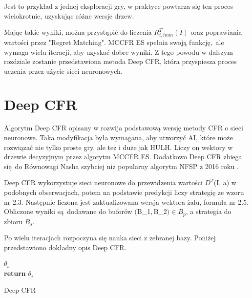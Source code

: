\documentclass[12pt,oneside,a4paper]{report}
\begin{document}
\vspace{5cm}
Jest to przykład z jednej eksploracji gry, w praktyce powtarza się ten proces wielokrotnie, 
uzyskując różne wersje drzew.


Mając takie wyniki, można przystąpić do liczenia $R_{i,imm}^{T} (I)$ oraz poprawiania 
wartości przez "Regret Matching". MCCFR ES spełnia swoją funkcję, ale wymaga wielu iteracji, aby
uzyskać dobre wyniki. Z tego powodu w dalszym rozdziale zostanie przedstawiona metoda Deep CFR,
która przyspiesza proces uczenia przez użycie sieci neuronowych.

\section{Deep CFR}


Algorytm Deep CFR  opisany w \cite{DCFR} rozwija podstawową wersję metody CFR o sieci neuronowe.
Taka modyfikacja była wymagana, aby utworzyć AI, które może rozwiązać nie tylko proste gry,
ale też i duże jak HULH. Liczy on wektory w drzewie decyzyjnym
przez algorytm MCCFR ES. Dodatkowo Deep CFR zbiega się do Równowagi Nasha szybciej niż 
popularny algorytm NFSP z 2016 roku \cite{DCFR}.

Deep CFR wykorzystuje sieci neuronowe do przewidzenia wartości $D^{T}$(I, a) w podobnych
obserwacjach, potem na
podstawie predykcji liczy strategię ze wzoru nr 2.3.   
Następnie liczona jest zaktualizowana wersja wektora żalu, formuła nr 2.5.
Obliczone wyniki są dodawane do buforów  $($B_{1}$, $B_{2}$) \in B_{p}$, a strategia do zbioru $B_{s}$.


Po wielu iteracjach
rozpoczyna się nauka sieci z zebranej bazy. Poniżej przedstawiono dokładny opis Deep CFR.
\vspace{1cm}

\begin{algorithm}[H]
\DontPrintSemicolon
  
$\theta_{s}$ \leftarrow {} \\
\textbf{return} $\theta_{s}$
 \caption{Deep CFR}
\end{algorithm}
\end{document}
